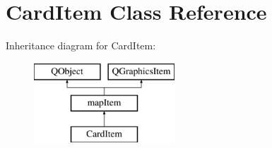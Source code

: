 \hypertarget{class_card_item}{\section{Card\-Item Class Reference}
\label{class_card_item}
}
Inheritance diagram for Card\-Item\-:\begin{figure}[H]
\begin{center}
\leavevmode
\includegraphics[height=3.000000cm]{class_card_item}
\end{center}
\end{figure}
